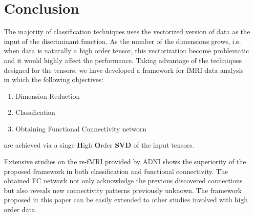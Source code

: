 \documentclass[journal]{IEEEtran}
\begin{document}
{	
	
	
	
	
	
	
	
	
	\section{Conclusion}
	The majority of classification techniques uses the vectorized version of data as the input of the discriminant function. As the number of the dimensions grows, i.e. when data is naturally a high order tensor, this vectorization become problematic and it would highly affect the  performance. Taking advantage of the techniques designed for the tensors, we have developed a framework for fMRI data analysis in which the following objectives: 
	\begin{enumerate}
		\item 
		Dimension Reduction
		\item 
		Classification 
		\item 
		Obtaining Functional Connectivity networn 
	\end{enumerate}
	are achieved via a singe \textbf{H}igh \textbf{O}rder \textbf{SVD} of the input tensors. 
	
	Extensive studies on the rs-fMRI provided by ADNI shows the superiority of the proposed framework in both classification and functional connectivity. The obtained FC network not only acknowledge the previous discovered connections but also reveals new connectivity patterns previously unknown.
	The framework proposed in this paper can be easily extended to other studies involved with high order data.  
	
}
\end{document}
